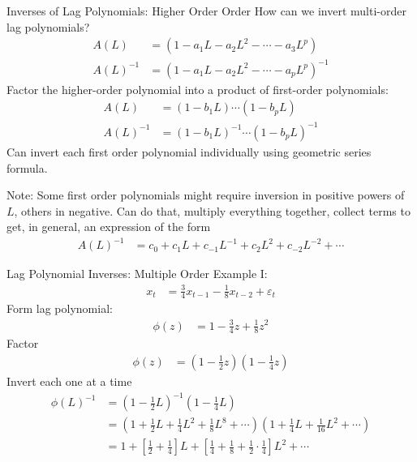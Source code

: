 \documentclass[aspectratio=169, handout]{beamer}
\begin{document}
{\footnotesize
\begin{frame}{Inverses of Lag Polynomials: Higher Order Order}
How can we invert multi-order lag polynomials?
\begin{align*}
  A(L)
  &=
  (1-a_1L - a_2L^2 - \cdots - a_3L^p)
  \\
  A(L)^{-1}
  &=
  (1-a_1L - a_2L^2 - \cdots - a_pL^p)^{-1}
\end{align*}
\alert{Factor} the higher-order polynomial into a product of first-order
polynomials:
\begin{align*}
  A(L)
  &=
  (1-b_1L)
  \cdots
  (1-b_pL)
  \\
  A(L)^{-1}
  &=
  (1-b_1L)^{-1}
  \cdots
  (1-b_pL)^{-1}
\end{align*}
Can invert each first order polynomial individually using geometric
series formula.

Note:
Some first order polynomials might require inversion in \alert{positive}
powers of $L$, others in \alert{negative}.
Can do that, multiply everything together, collect terms to get, in
general, an expression of the form
\begin{align*}
  A(L)^{-1}
  &=
  c_0 + c_1 L + c_{-1}L^{-1} + c_2 L^2 + c_{-2} L^{-2} + \cdots
\end{align*}

\end{frame}
}


{\footnotesize
\begin{frame}{Lag Polynomial Inverses: Multiple Order}
Example I:
\begin{align*}
  x_t
  &=
  \frac{3}{4}x_{t-1} - \frac{1}{8}x_{t-2}
  +
  \varepsilon_t
\end{align*}
\pause
Form lag polynomial:
\begin{align*}
  \phi(z)
  &=
  1 - \frac{3}{4}z + \frac{1}{8}z^2
\end{align*}
\pause
Factor
\begin{align*}
  \phi(z)
  &=
  \left(
    1-\frac{1}{2}z
  \right)
  \left(
    1-\frac{1}{4}z
  \right)
\end{align*}
\pause
Invert each one at a time
\begin{align*}
  \phi(L)^{-1}
  &=
  \left(
    1-\frac{1}{2}L
  \right)^{-1}
  \left(
    1-\frac{1}{4}L
  \right)
  \\
  &=
  \left(
    1
    +\frac{1}{2}L
    +\frac{1}{4}L^2
    +\frac{1}{8}L^8
    +\cdots
  \right)
  \left(
    1
    +\frac{1}{4}L
    +\frac{1}{16}L^2
    +\cdots
  \right)
  \\
  &=
  1
  +
  \left[
    \frac{1}{2}
    +
    \frac{1}{4}
  \right]
  L
  +
  \left[
    \frac{1}{4}
    +
    \frac{1}{8}
    +
    \frac{1}{2}
    \cdot
    \frac{1}{4}
  \right]
  L^2
  +
  \cdots
\end{align*}
\end{frame}
}
\end{document}

